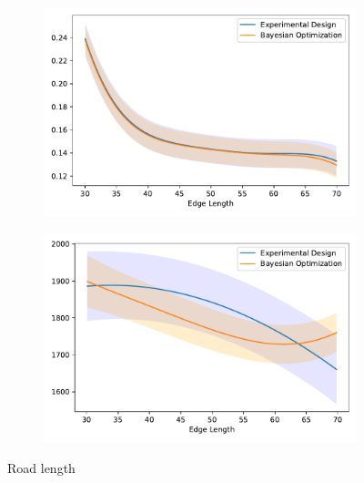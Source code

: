\begin{figure}[h!]
\centering
\begin{subfigure}{0.5\textwidth}
  \centering
  \includegraphics[width=\textwidth]{images/ofat_compare/time/edge_length.pdf}
\end{subfigure}%
\begin{subfigure}{0.5\textwidth}
  \centering
  \includegraphics[width=\textwidth]{images/ofat_compare/co2/edge_length.pdf}
\end{subfigure}
\caption{Road length}
\end{figure}

